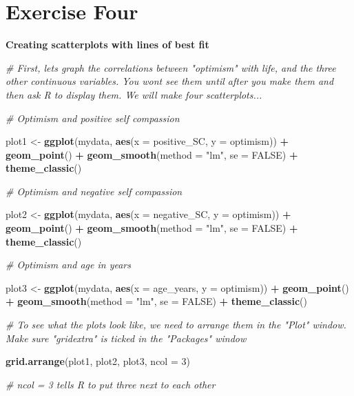 \documentclass[
]{book}
\newenvironment{Shaded}{\begin{snugshade}}{\end{snugshade}}
\newcommand{\AttributeTok}[1]{\textcolor[rgb]{0.13,0.29,0.53}{#1}}
\newcommand{\CommentTok}[1]{\textcolor[rgb]{0.56,0.35,0.01}{\textit{#1}}}
\newcommand{\ConstantTok}[1]{\textcolor[rgb]{0.56,0.35,0.01}{#1}}
\newcommand{\DecValTok}[1]{\textcolor[rgb]{0.00,0.00,0.81}{#1}}
\newcommand{\FunctionTok}[1]{\textcolor[rgb]{0.13,0.29,0.53}{\textbf{#1}}}
\newcommand{\NormalTok}[1]{#1}
\newcommand{\OtherTok}[1]{\textcolor[rgb]{0.56,0.35,0.01}{#1}}
\newcommand{\SpecialCharTok}[1]{\textcolor[rgb]{0.81,0.36,0.00}{\textbf{#1}}}
\newcommand{\StringTok}[1]{\textcolor[rgb]{0.31,0.60,0.02}{#1}}
\let\oldsection\section
\renewcommand{\section}{\needspace{5\baselineskip}\oldsection}
\begin{document}
\section{Exercise Four}\label{exercise-four-1}

\textbf{Creating scatterplots with lines of best fit}

\begin{Shaded}
\begin{Highlighting}[]
\CommentTok{\# First, let\textquotesingle{}s graph the correlations between "optimism" with life, and the three other continuous variables. You won\textquotesingle{}t see them until after you make them and then ask R to display them. We will make four scatterplots...}

\CommentTok{\# Optimism and positive self compassion}

\NormalTok{plot1 }\OtherTok{\textless{}{-}} \FunctionTok{ggplot}\NormalTok{(mydata, }\FunctionTok{aes}\NormalTok{(}\AttributeTok{x =}\NormalTok{ positive\_SC, }\AttributeTok{y =}\NormalTok{ optimism)) }\SpecialCharTok{+}
  \FunctionTok{geom\_point}\NormalTok{() }\SpecialCharTok{+}
  \FunctionTok{geom\_smooth}\NormalTok{(}\AttributeTok{method =} \StringTok{"lm"}\NormalTok{,}
              \AttributeTok{se =} \ConstantTok{FALSE}\NormalTok{) }\SpecialCharTok{+}
  \FunctionTok{theme\_classic}\NormalTok{()}

\CommentTok{\# Optimism and negative self compassion}

\NormalTok{plot2 }\OtherTok{\textless{}{-}} \FunctionTok{ggplot}\NormalTok{(mydata, }\FunctionTok{aes}\NormalTok{(}\AttributeTok{x =}\NormalTok{ negative\_SC, }\AttributeTok{y =}\NormalTok{ optimism)) }\SpecialCharTok{+}
  \FunctionTok{geom\_point}\NormalTok{() }\SpecialCharTok{+}
  \FunctionTok{geom\_smooth}\NormalTok{(}\AttributeTok{method =} \StringTok{"lm"}\NormalTok{,}
              \AttributeTok{se =} \ConstantTok{FALSE}\NormalTok{) }\SpecialCharTok{+}
  \FunctionTok{theme\_classic}\NormalTok{()}

\CommentTok{\# Optimism and age in years}

\NormalTok{plot3 }\OtherTok{\textless{}{-}} \FunctionTok{ggplot}\NormalTok{(mydata, }\FunctionTok{aes}\NormalTok{(}\AttributeTok{x =}\NormalTok{ age\_years, }\AttributeTok{y =}\NormalTok{ optimism)) }\SpecialCharTok{+}
  \FunctionTok{geom\_point}\NormalTok{() }\SpecialCharTok{+}
  \FunctionTok{geom\_smooth}\NormalTok{(}\AttributeTok{method =} \StringTok{"lm"}\NormalTok{,}
              \AttributeTok{se =} \ConstantTok{FALSE}\NormalTok{) }\SpecialCharTok{+}
  \FunctionTok{theme\_classic}\NormalTok{()}

\CommentTok{\# To see what the plots look like, we need to arrange them in the "Plot" window. Make sure "gridextra" is ticked in the "Packages" window}

\FunctionTok{grid.arrange}\NormalTok{(plot1, plot2, plot3, }\AttributeTok{ncol =} \DecValTok{3}\NormalTok{)  }

\CommentTok{\# ncol = 3 tells R to put three next to each other}
\end{Highlighting}
\end{Shaded}
\end{document}
